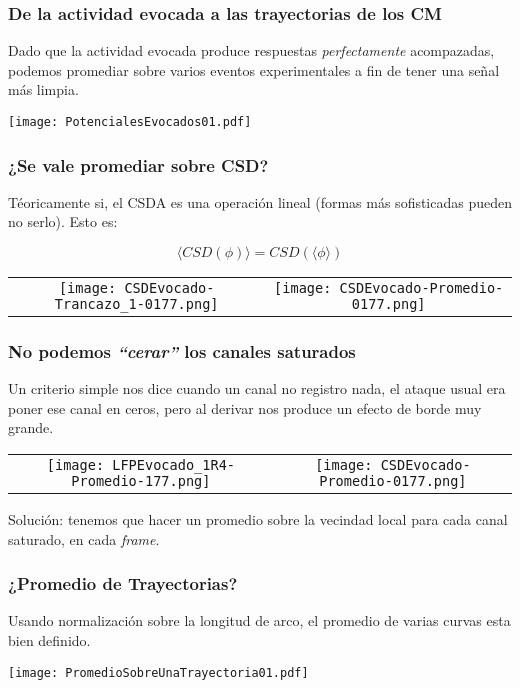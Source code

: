 \documentclass{beamer}
\begin{document}
\begin{frame}
  \frametitle{De la actividad evocada a las trayectorias de los CM}
  Dado que la actividad evocada produce respuestas
  \emph{perfectamente} acompazadas, podemos
  promediar sobre varios eventos experimentales
  a fin de tener una señal más limpia. 
  \begin{center}
   \texttt{[image: PotencialesEvocados01.pdf]} 
  \end{center}
\end{frame}


\begin{frame}
  \frametitle{¿Se vale promediar sobre CSD?}
    Téoricamente si, el CSDA es una operación lineal
    (formas más sofisticadas pueden no serlo). Esto es:
    
\begin{equation}
 \langle CSD(\phi) \rangle = CSD (\langle \phi \rangle)
\end{equation}

\begin{center}
  \begin{tabular}{cc}
    \texttt{[image: CSDEvocado-Trancazo\_1-0177.png]} &
    \texttt{[image: CSDEvocado-Promedio-0177.png]} 
  \end{tabular}
\end{center}
    
\end{frame}


\begin{frame}
  \frametitle{No podemos \emph{``cerar''} los canales saturados}
  Un criterio simple nos dice cuando un canal no registro nada,
  el ataque usual era poner ese canal en ceros, pero al derivar
  nos produce un efecto de borde muy grande.
  
\begin{center}
  \begin{tabular}{cc}
    \texttt{[image: LFPEvocado\_1R4-Promedio-177.png]} &
    \texttt{[image: CSDEvocado-Promedio-0177.png]} 
  \end{tabular}
\end{center}
Solución: tenemos que hacer un promedio sobre la vecindad local
para cada canal saturado, en cada \emph{frame}.
\end{frame}


\begin{frame}
\frametitle{¿Promedio de Trayectorias?}
Usando normalización sobre la longitud de arco, el
promedio de varias curvas esta bien definido.
\begin{center}
\texttt{[image: PromedioSobreUnaTrayectoria01.pdf]}
\end{center}
\end{frame}
\end{document}
